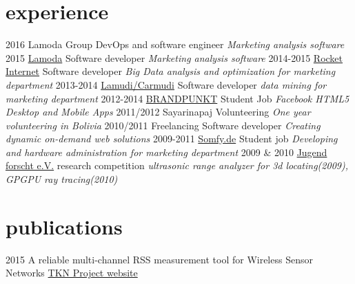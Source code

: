 \documentclass[]{friggeri-cv}
\begin{document}
\section{experience}

\begin{entrylist}
  \entry
    {2016}
    {{Lamoda Group}}
    {DevOps and software engineer}
    {\emph{Marketing analysis software}}
  \entry
    {2015}
    {\href{http://www.lamoda.ru/}{Lamoda}}
    {Software developer}
    {\emph{Marketing analysis software}}
  \entry
    {2014-2015}
    {\href{http://www.rocket-internet.com/}{Rocket Internet}}
    {Software developer}
    {\emph{Big Data analysis and optimization for marketing department}}
  \entry
    {2013-2014}
    {\href{http://www.lamudi.com/}{Lamudi/Carmudi}}
    {Software developer}
    {\emph{data mining for marketing department}}
  \entry
    {2012-2014}
    {\href{http://brandpunkt.com}{BRANDPUNKT}}
    {Student Job}
    {\emph{Facebook HTML5 Desktop and Mobile Apps}}
  \entry
    {2011/2012}
    {Sayarinapaj}
    {Volunteering}
    {\emph{One year volunteering in Bolivia}}
  \entry
    {2010/2011}
    {Freelancing}
    {Software developer}
    {\emph{Creating dynamic on-demand web solutions}}
  \entry
    {2009-2011}
    {\href{http://www.somfy.de}{Somfy.de}}
    {Student job}
    {\emph{Developing and hardware administration for marketing department }}
  \entry
    {2009 \& 2010}
    {\href{http://jugend-forscht.de}{Jugend forscht e.V.}}
    {research competition}
    {\emph{ultrasonic range analyzer for 3d locating(2009), GPGPU ray tracing(2010)}}
\end{entrylist}

%

\section{publications}

\begin{entrylist}
  \entry
    {2015}
    {A reliable multi-channel RSS measurement tool for Wireless Sensor Networks}
    {\href{http://www.tkn.tu-berlin.de/index.php?id=159554}{TKN Project website}}
    {}
\end{entrylist}
\end{document}
